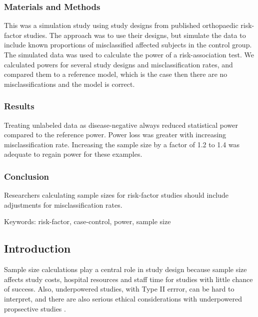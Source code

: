 \documentclass[
]{article}
\begin{document}
\hypertarget{materials-and-methods}{%
\subsubsection{Materials and Methods}\label{materials-and-methods}}

This was a simulation study using study designs from published
orthopaedic risk-factor studies. The approach was to use their designs,
but simulate the data to include known proportions of misclassified
affected subjects in the control group. The simulated data was used to
calculate the power of a risk-association test. We calculated powers for
several study designs and misclassification rates, and compared them to
a reference model, which is the case then there are no
misclassifications and the model is correct.

\hypertarget{results}{%
\subsubsection{Results}\label{results}}

Treating unlabeled data as disease-negative always reduced statistical
power compared to the reference power. Power loss was greater with
increasing misclassification rate. Increasing the sample size by a
factor of 1.2 to 1.4 was adequate to regain power for these examples.

\hypertarget{conclusion}{%
\subsubsection{Conclusion}\label{conclusion}}

Researchers calculating sample sizes for risk-factor studies should
include adjustments for misclassification rates.

Keywords: risk-factor, case-control, power, sample size

\newpage

\hypertarget{introduction}{%
\subsection{Introduction}\label{introduction}}

Sample size calculations play a central role in study design because
sample size affects study costs, hospital resources and staff time for
studies with little chance of success. Also, underpowered studies, with
Type II errror, can be hard to interpret, and there are also serious
ethical considerations with underpowered propsective studies
\cite{ halpern2002continuing, hofmeister2007sample}.
\end{document}
